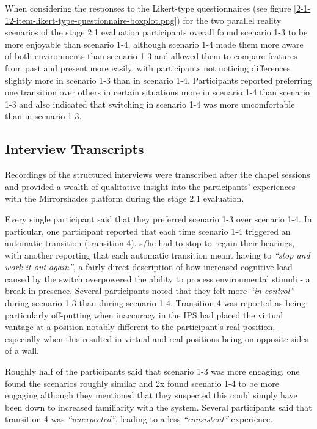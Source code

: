 When considering the responses to the Likert-type questionnaires (see figure \ref{2-1-12-item-likert-type-questionnaire-boxplot.png}) for the two parallel reality scenarios of the stage 2.1 evaluation participants overall found scenario 1-3 to be more enjoyable than scenario 1-4, although scenario 1-4 made them more aware of both environments than scenario 1-3 and allowed them to compare features from past and present more easily, with participants not noticing differences slightly more in scenario 1-3 than in scenario 1-4. Participants reported preferring one transition over others in certain situations more in scenario 1-4 than scenario 1-3 and also indicated that switching in scenario 1-4 was more uncomfortable than in scenario 1-3.


\subsection{Interview Transcripts}

Recordings of the structured interviews were transcribed after the chapel sessions and provided a wealth of qualitative insight into the participants' experiences with the Mirrorshades platform during the stage 2.1 evaluation.

Every single participant said that they preferred scenario 1-3 over scenario 1-4. In particular, one participant  reported that each time scenario 1-4 triggered an automatic transition (transition 4), s/he had to stop to regain their bearings, with another reporting that each automatic transition meant having to \textit{``stop and work it out again''}, a fairly direct description of how increased cognitive load caused by the switch overpowered the ability to process environmental stimuli - a break in presence. Several participants noted that they felt more \textit{``in control''} during scenario 1-3 than during scenario 1-4. Transition 4 was reported as being particularly off-putting when inaccuracy in the IPS had placed the virtual vantage at a position notably different to the participant's real position, especially when this resulted in virtual and real positions being on opposite sides of a wall.

Roughly half of the participants said that scenario 1-3 was more engaging, one found the scenarios roughly similar and 2x found scenario 1-4 to be more engaging although they mentioned that they suspected this could simply have been down to increased familiarity with the system. Several participants said that transition 4 was \textit{``unexpected''}, leading to a less \textit{``consistent''} experience.

